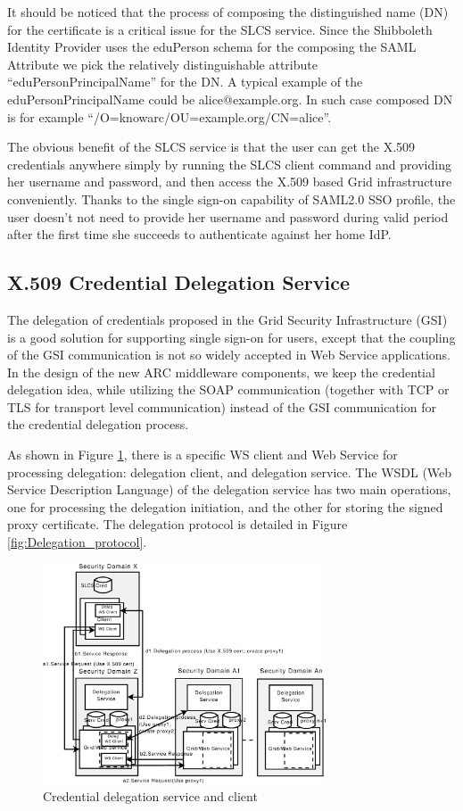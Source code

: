 It should be noticed that the process of composing the distinguished name (DN) for the certificate is a critical issue for the SLCS service. Since the Shibboleth Identity Provider uses the eduPerson schema\cite{eduSchemalink} for the composing the SAML Attribute we pick the relatively distinguishable attribute “eduPersonPrincipalName” for the DN. A typical example of the eduPersonPrincipalName  could be alice@example.org. In such case composed DN is for example “/O=knowarc/OU=example.org/CN=alice”.

The obvious benefit of the SLCS service is that the user can get the X.509 credentials anywhere simply by running the SLCS client command and providing her username and password, and then access the X.509 based Grid infrastructure conveniently. Thanks to the single sign-on capability of SAML2.0 SSO profile, the user doesn’t not need to provide her username and password during valid period after the first time she succeeds to authenticate against her home IdP.


\subsection{X.509 Credential Delegation Service}
\label{sec:creddeleg}
The delegation of credentials proposed in the Grid Security Infrastructure (GSI) is a good solution for supporting single sign-on for users, except that the coupling of the GSI communication is not so widely accepted in Web Service applications. In the design of the new ARC middleware components, we keep the credential delegation idea, while utilizing the SOAP communication (together with TCP or TLS for transport level communication) instead of the GSI communication for the credential delegation process.

As shown in Figure \ref{fig:Delegation}, there is a specific WS client and Web Service for processing delegation: delegation client, and delegation service. The WSDL (Web Service Description Language) of the delegation service has two main operations, one for processing the delegation initiation, and the other for storing the signed proxy certificate. The delegation protocol is detailed in Figure \ref{fig:Delegation_protocol}.

\begin{figure}
\includegraphics[width=0.75\textwidth]{Delegation.eps}
\caption{Credential delegation service and client}
\label{fig:Delegation}
\end{figure}

